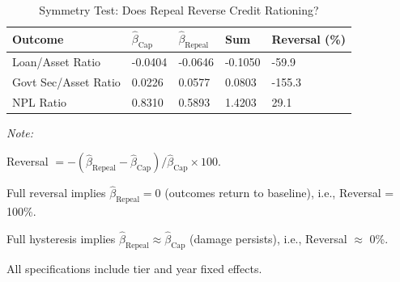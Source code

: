 \begin{table}[!h]
\centering
\caption{Symmetry Test: Does Repeal Reverse Credit Rationing?}
\label{tab:symmetry}
\begin{threeparttable}
\begin{tabular}[t]{lllll}
\toprule
Outcome & $\hat{\beta}_{\text{Cap}}$ & $\hat{\beta}_{\text{Repeal}}$ & Sum & Reversal (\%)\\
\midrule
Loan/Asset Ratio & -0.0404 & -0.0646 & -0.1050 & -59.9\\
Govt Sec/Asset Ratio & 0.0226 & 0.0577 & 0.0803 & -155.3\\
NPL Ratio & 0.8310 & 0.5893 & 1.4203 & 29.1\\
\bottomrule
\end{tabular}
\begin{tablenotes}
\item \textit{Note:}
\item Reversal $= -(\hat{\beta}_{\text{Repeal}} - \hat{\beta}_{\text{Cap}}) / \hat{\beta}_{\text{Cap}} \times 100$.
\item Full reversal implies $\hat{\beta}_{\text{Repeal}} = 0$ (outcomes return to baseline), i.e., Reversal = 100\%.
\item Full hysteresis implies $\hat{\beta}_{\text{Repeal}} \approx \hat{\beta}_{\text{Cap}}$ (damage persists), i.e., Reversal $\approx$ 0\%.
\item All specifications include tier and year fixed effects.
\end{tablenotes}
\end{threeparttable}
\end{table}
